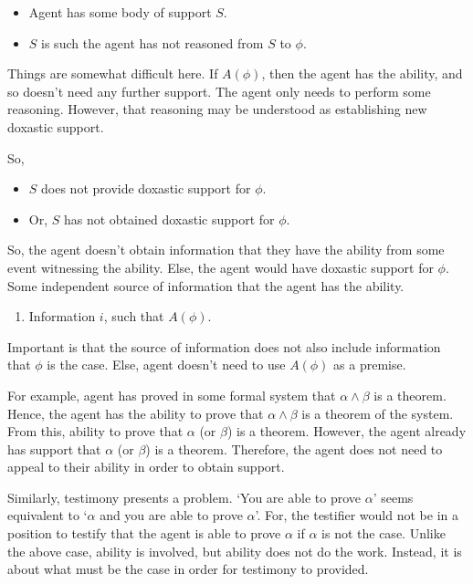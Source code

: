 \begin{itemize}
\item Agent has some body of support \(S\).
\item \(S\) is such the agent has not reasoned from \(S\) to \(\phi\).
\end{itemize}

Things are somewhat difficult here.
If \(A(\phi)\), then the agent has the ability, and so doesn't need any further support.
The agent only needs to perform some reasoning.
However, that reasoning may be understood as establishing new doxastic support.

So,

\begin{itemize}
\item \(S\) does not provide doxastic support for \(\phi\).
\item Or, \(S\) has not obtained doxastic support for \(\phi\).
\end{itemize}

So, the agent doesn't obtain information that they have the ability from some event witnessing the ability.
Else, the agent would have doxastic support for \(\phi\).
Some independent source of information that the agent has the ability.

\begin{enumerate}
\item\label{abGen:i} Information \(i\), such that \(A(\phi)\).
\end{enumerate}

Important is that the source of information does not also include information that \(\phi\) is the case.
Else, agent doesn't need to use \(A(\phi)\) as a premise.

For example, agent has proved in some formal system that \(\alpha \land \beta\) is a theorem.
Hence, the agent has the ability to prove that \(\alpha \land \beta\) is a theorem of the system.
From this, ability to prove that \(\alpha\) (or \(\beta\)) is a theorem.
However, the agent already has support that \(\alpha\) (or \(\beta\)) is a theorem.
Therefore, the agent does not need to appeal to their ability in order to obtain support.

Similarly, testimony presents a problem.
`You are able to prove \(\alpha\)' seems equivalent to `\(\alpha\) and you are able to prove \(\alpha\)'.
For, the testifier would not be in a position to testify that the agent is able to prove \(\alpha\) if \(\alpha\) is not the case.
Unlike the above case, ability is involved, but ability does not do the work.
Instead, it is about what must be the case in order for testimony to provided.

